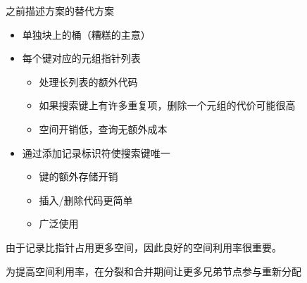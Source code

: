 之前描述方案的替代方案

\begin{itemize}
    \item 单独块上的桶（糟糕的主意）
    \item 每个键对应的元组指针列表
       \begin{itemize}
           \item 处理长列表的额外代码
           \item 如果搜索键上有许多重复项，删除一个元组的代价可能很高
           \item 空间开销低，查询无额外成本
       \end{itemize}
    \item 通过添加记录标识符使搜索键唯一
       \begin{itemize}
           \item 键的额外存储开销
           \item 插入/删除代码更简单
           \item 广泛使用
       \end{itemize}
\end{itemize}

由于记录比指针占⽤更多空间，因此良好的空间利⽤率很重要。

为提高空间利⽤率，在分裂和合并期间让更多兄弟节点参与重新分配